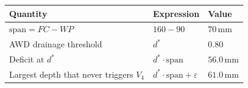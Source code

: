 
\begin{tabular}{@{}lll@{}}
\toprule
Quantity & Expression & Value \\
\midrule
$\mathrm{span}=FC-WP$ & $160-90$ & $70$\,mm \\
AWD drainage threshold & $d^{*}$ & $0.80$ \\
Deficit at $d^{*}$ & $d^{*}\cdot\mathrm{span}$ & $56.0$\,mm \\
Largest depth that never triggers $V_4$ & $d^{*}\cdot\mathrm{span}+\varepsilon$ & $61.0$\,mm \\
\bottomrule
\end{tabular}
